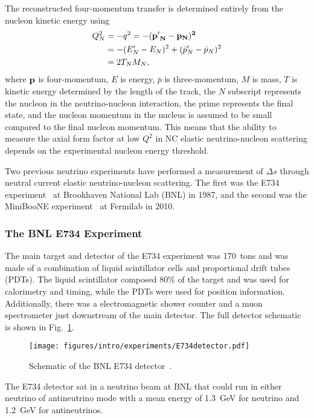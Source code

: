     The reconstructed four-momentum transfer is
    determined entirely from the nucleon kinetic energy using
    \begin{align*}
      Q^2_N &= -q^2 = -(\bf{p'}_N - \bf{p}_N)^2 \\
            &= -(E'_N - E_N)^2 + (\bar{p}'_N - \bar{p}_N)^2 \\
            &= 2 T_N M_N,
    \end{align*}
    where $\bf{p}$ is four-momentum, $E$ is energy, $\bar{p}$ is
    three-momentum, $M$ is mass, $T$ is kinetic energy determined by the length
    of the track, the $N$ subscript represents the nucleon in the
    neutrino-nucleon interaction, the prime represents the final state, and the
    nucleon momentum in the nucleus is assumed to be small compared to the
    final nucleon momentum. This means that the ability to measure the axial
    form factor at low $Q^2$ in NC elastic neutrino-nucleon scattering depends
    on the experimental nucleon energy threshold.

    Two previous neutrino experiments have performed a measurement of $\Delta
    s$ through neutral current elastic neutrino-nucleon scattering. The first
    was the E734 experiment~\cite{Ahrens:1986xe} at Brookhaven National Lab (BNL) in
    1987, and the second was the MiniBooNE experiment~\cite{Aguilar-Arevalo:2010cx} at
    Fermilab in 2010.

    \subsubsection{The BNL E734 Experiment}\label{sec:e734}
    The main target and detector of the E734 experiment was 170~tons and was
    made of a combination of liquid scintillator cells and proportional drift
    tubes (PDTs). The liquid scintillator composed 80\% of the target and was
    used for calorimetry and timing, while the PDTs were used for position
    information. Additionally, there was a electromagnetic shower counter and a
    muon spectrometer just downstream of the main detector. The full detector
    schematic is shown in Fig.~\ref{fig:e734detector}.
    \begin{figure}[h]
      \centering
      \texttt{[image: figures/intro/experiments/E734detector.pdf]}
      \caption{Schematic of the BNL E734 detector~\cite{Ahrens:1986xe}.}
      \label{fig:e734detector}
    \end{figure}
    The E734 detector sat in a neutrino beam at BNL that could run in either
    neutrino of antineutrino mode with a mean energy of 1.3~GeV for neutrino
    and 1.2~GeV for antineutrinos.

